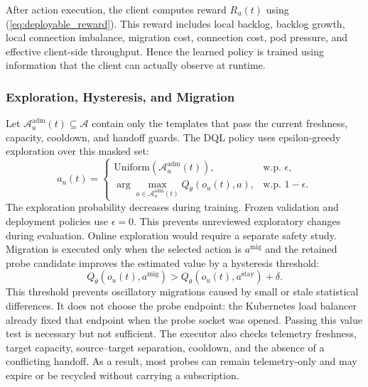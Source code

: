 \documentclass[manuscript,nonacm]{acmart}
\begin{document}
After action execution, the client computes reward $R_u(t)$ using
(\ref{eq:deployable_reward}). This reward includes local backlog, backlog
growth, local connection imbalance, migration cost, connection cost, pod
pressure, and effective client-side throughput. Hence the learned policy is
trained using information that the client can actually observe at runtime.

\subsubsection{Exploration, Hysteresis, and Migration}

Let $\mathcal{A}^{\mathrm{adm}}_u(t)\subseteq\mathcal{A}$ contain only the templates
that pass the current freshness, capacity, cooldown, and handoff guards. The
DQL policy uses epsilon-greedy exploration over this masked set:
\begin{equation}
	a_u(t)=
	\begin{cases}
		\text{Uniform}(\mathcal{A}^{\mathrm{adm}}_u(t)), & \text{w.p. } \epsilon,\\
		\arg\max_{a\in\mathcal{A}^{\mathrm{adm}}_u(t)} Q_\theta(o_u(t),a), & \text{w.p. } 1-\epsilon.
	\end{cases}
\end{equation}
The exploration probability decreases during training. Frozen validation and
deployment policies use $\epsilon=0$. This prevents unreviewed exploratory
changes during evaluation. Online exploration would require a separate
safety study. Migration is
executed only when the selected action is $a^{\mathrm{mig}}$ and the retained probe
candidate improves the estimated value by a hysteresis threshold:
\begin{equation}
	Q_\theta(o_u(t),a^{\mathrm{mig}}) >
	Q_\theta(o_u(t),a^{\mathrm{stay}})+\delta.
\end{equation}
This threshold prevents oscillatory migrations caused by small or stale
statistical differences. It does not choose the probe endpoint: the Kubernetes
load balancer already fixed that endpoint when the probe socket was opened.
Passing this value test is necessary but not sufficient. The executor also
checks telemetry freshness, target capacity, source--target separation, cooldown,
and the absence of a conflicting handoff. As a result, most probes
can remain telemetry-only and may expire or be recycled without carrying a
subscription.
\end{document}
